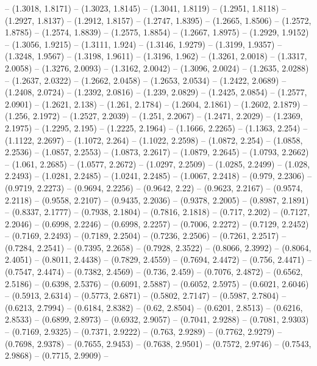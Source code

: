 {  -- (1.3018, 1.8171) -- (1.3023, 1.8145) -- (1.3041, 1.8119) -- (1.2951, 
  1.8118) -- (1.2927, 1.8137) -- (1.2912, 1.8157) -- (1.2747, 1.8395) -- 
  (1.2665, 1.8506) -- (1.2572, 1.8785) -- (1.2574, 1.8839) -- (1.2575, 1.8854) 
  -- (1.2667, 1.8975) -- (1.2929, 1.9152) -- (1.3056, 1.9215) -- (1.3111, 1.924)
   -- (1.3146, 1.9279) -- (1.3199, 1.9357) -- (1.3248, 1.9567) -- (1.3198, 
  1.9611) -- (1.3196, 1.962) -- (1.3261, 2.0018) -- (1.3317, 2.0058) -- (1.3276,
   2.0093) -- (1.3162, 2.0042) -- (1.3096, 2.0024) -- (1.2635, 2.0288) -- 
  (1.2637, 2.0322) -- (1.2662, 2.0458) -- (1.2653, 2.0534) -- (1.2422, 2.0689) 
  -- (1.2408, 2.0724) -- (1.2392, 2.0816) -- (1.239, 2.0829) -- (1.2425, 2.0854)
   -- (1.2577, 2.0901) -- (1.2621, 2.138) -- (1.261, 2.1784) -- (1.2604, 2.1861)
   -- (1.2602, 2.1879) -- (1.256, 2.1972) -- (1.2527, 2.2039) -- (1.251, 2.2067)
   -- (1.2471, 2.2029) -- (1.2369, 2.1975) -- (1.2295, 2.195) -- (1.2225, 
  2.1964) -- (1.1666, 2.2265) -- (1.1363, 2.254) -- (1.1122, 2.2697) -- (1.1072,
   2.264) -- (1.1022, 2.2598) -- (1.0872, 2.254) -- (1.0858, 2.2536) -- (1.0857,
   2.2553) -- (1.0873, 2.2617) -- (1.0879, 2.2645) -- (1.0793, 2.2662) -- 
  (1.061, 2.2685) -- (1.0577, 2.2672) -- (1.0297, 2.2509) -- (1.0285, 2.2499) --
   (1.028, 2.2493) -- (1.0281, 2.2485) -- (1.0241, 2.2485) -- (1.0067, 2.2418) 
  -- (0.979, 2.2306) -- (0.9719, 2.2273) -- (0.9694, 2.2256) -- (0.9642, 2.22) 
  -- (0.9623, 2.2167) -- (0.9574, 2.2118) -- (0.9558, 2.2107) -- (0.9435, 
  2.2036) -- (0.9378, 2.2005) -- (0.8987, 2.1891) -- (0.8337, 2.1777) -- 
  (0.7938, 2.1804) -- (0.7816, 2.1818) -- (0.717, 2.202) -- (0.7127, 2.2046) -- 
  (0.6998, 2.2246) -- (0.6998, 2.2257) -- (0.7006, 2.2272) -- (0.7129, 2.2452) 
  -- (0.7169, 2.2493) -- (0.7189, 2.2504) -- (0.7236, 2.2506) -- (0.7261, 
  2.2517) -- (0.7284, 2.2541) -- (0.7395, 2.2658) -- (0.7928, 2.3522) -- 
  (0.8066, 2.3992) -- (0.8064, 2.4051) -- (0.8011, 2.4438) -- (0.7829, 2.4559) 
  -- (0.7694, 2.4472) -- (0.756, 2.4471) -- (0.7547, 2.4474) -- (0.7382, 2.4569)
   -- (0.736, 2.459) -- (0.7076, 2.4872) -- (0.6562, 2.5186) -- (0.6398, 2.5376)
   -- (0.6091, 2.5887) -- (0.6052, 2.5975) -- (0.6021, 2.6046) -- (0.5913, 
  2.6314) -- (0.5773, 2.6871) -- (0.5802, 2.7147) -- (0.5987, 2.7804) -- 
  (0.6213, 2.7994) -- (0.6184, 2.8382) -- (0.62, 2.8504) -- (0.6201, 2.8513) -- 
  (0.6216, 2.8533) -- (0.6899, 2.8973) -- (0.6932, 2.9057) -- (0.7041, 2.9288) 
  -- (0.7081, 2.9303) -- (0.7169, 2.9325) -- (0.7371, 2.9222) -- (0.763, 2.9289)
   -- (0.7762, 2.9279) -- (0.7698, 2.9378) -- (0.7655, 2.9453) -- (0.7638, 
  2.9501) -- (0.7572, 2.9746) -- (0.7543, 2.9868) -- (0.7715, 2.9909) -- 
}
